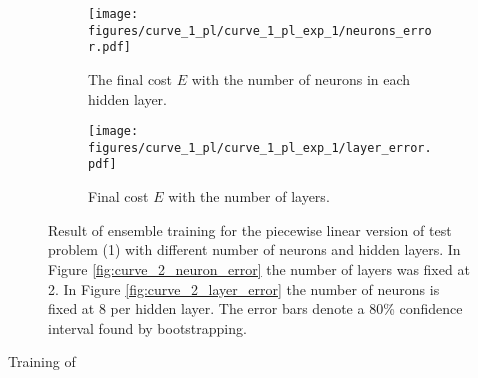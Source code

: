 \begin{figure}[t]\label{fig:curve_1_pl_eks}
    \begin{subfigure}[t]{0.5\textwidth}
        \centering
        \texttt{[image: figures/curve\_1\_pl/curve\_1\_pl\_exp\_1/neurons\_error.pdf]}
        \caption{The final cost \(E\) with the number of neurons in each hidden layer.}
        \label{fig:curve_1_pl_neuron_error}
    \end{subfigure}
    \begin{subfigure}[t]{0.5\textwidth}
        \centering
        \texttt{[image: figures/curve\_1\_pl/curve\_1\_pl\_exp\_1/layer\_error.pdf]}
        \caption{Final cost \(E\) with the number of layers.}
        \label{fig:curve_1_pl_layer_error}
    \end{subfigure}
    \caption{Result of ensemble training for the piecewise linear version of test problem (1) with different number of neurons and hidden layers. In Figure \ref{fig:curve_2_neuron_error} the number of layers was fixed at 2. In Figure \ref{fig:curve_2_layer_error} the number of neurons is fixed at 8 per hidden layer. The error bars denote a 80\% confidence interval found by bootstrapping.}
\end{figure}

Training of